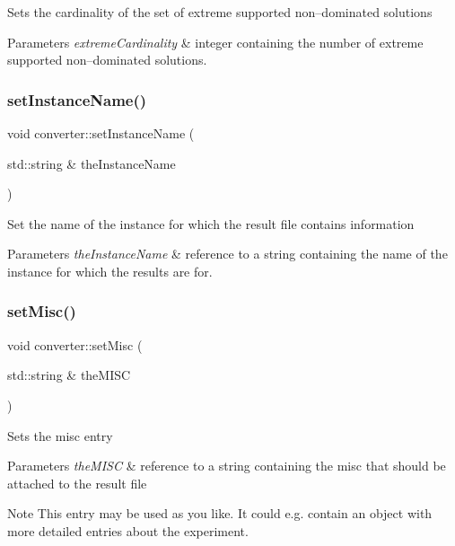Sets the cardinality of the set of extreme supported non--dominated solutions 
\begin{DoxyParams}{Parameters}
{\em extreme\+Cardinality} & integer containing the number of extreme supported non--dominated solutions. \\
\hline
\end{DoxyParams}
\mbox{\label{classconverter_a6ccb23d7caebaba593b02f37689a382f}} 
\subsubsection{\texorpdfstring{set\+Instance\+Name()}{setInstanceName()}}
{\footnotesize\ttfamily void converter\+::set\+Instance\+Name (\begin{DoxyParamCaption}\item[{std\+::string \&}]{the\+Instance\+Name }\end{DoxyParamCaption})\hspace{0.3cm}{\ttfamily [inline]}}

Set the name of the instance for which the result file contains information 
\begin{DoxyParams}{Parameters}
{\em the\+Instance\+Name} & reference to a string containing the name of the instance for which the results are for. \\
\hline
\end{DoxyParams}
\mbox{\label{classconverter_ab797244665254fdce6075082358594fd}} 
\subsubsection{\texorpdfstring{set\+Misc()}{setMisc()}}
{\footnotesize\ttfamily void converter\+::set\+Misc (\begin{DoxyParamCaption}\item[{std\+::string \&}]{the\+M\+I\+SC }\end{DoxyParamCaption})\hspace{0.3cm}{\ttfamily [inline]}}

Sets the misc entry 
\begin{DoxyParams}{Parameters}
{\em the\+M\+I\+SC} & reference to a string containing the misc that should be attached to the result file \\
\hline
\end{DoxyParams}
\begin{DoxyNote}{Note}
This entry may be used as you like. It could e.\+g. contain an object with more detailed entries about the experiment. 
\end{DoxyNote}
\mbox{\label{classconverter_a8b216dcddabf7fba23797689befa88d8}} 
